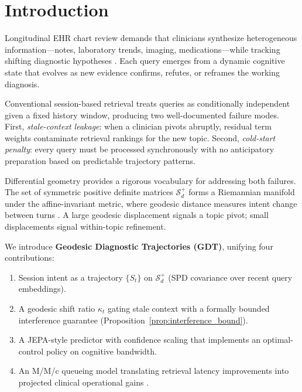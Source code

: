 \documentclass[journal,10pt,twoside]{IEEEtran}
\begin{document}
\section{Introduction}
\label{sec:intro}

Longitudinal EHR chart review demands that clinicians synthesize heterogeneous information---notes, laboratory trends, imaging, medications---while tracking shifting diagnostic hypotheses \cite{topol2019}. Each query emerges from a dynamic cognitive state that evolves as new evidence confirms, refutes, or reframes the working diagnosis.

Conventional session-based retrieval treats queries as conditionally independent given a fixed history window, producing two well-documented failure modes. First, \emph{stale-context leakage}: when a clinician pivots abruptly, residual term weights contaminate retrieval rankings for the new topic. Second, \emph{cold-start penalty}: every query must be processed synchronously with no anticipatory preparation based on predictable trajectory patterns.

Differential geometry provides a rigorous vocabulary for addressing both failures. The set of symmetric positive definite matrices $\mathcal{S}_d^+$ forms a Riemannian manifold under the affine-invariant metric, where geodesic distance measures intent change between turns \cite{pennec2006_spd}. A large geodesic displacement signals a topic pivot; small displacements signal within-topic refinement.

We introduce \textbf{Geodesic Diagnostic Trajectories (GDT)}, unifying four contributions:
\begin{enumerate}
  \item Session intent as a trajectory $\{S_t\}$ on $\mathcal{S}_d^+$ (SPD covariance over recent query embeddings).
  \item A geodesic shift ratio $\kappa_t$ gating stale context with a formally bounded interference guarantee (Proposition~\ref{prop:interference_bound}).
  \item A JEPA-style \cite{assran2023_ijepa} predictor with confidence scaling that implements an optimal-control policy on cognitive bandwidth.
  \item An M/M/c queueing model translating retrieval latency improvements into projected clinical operational gains \cite{kleinrock1975}.
\end{enumerate}
\end{document}
